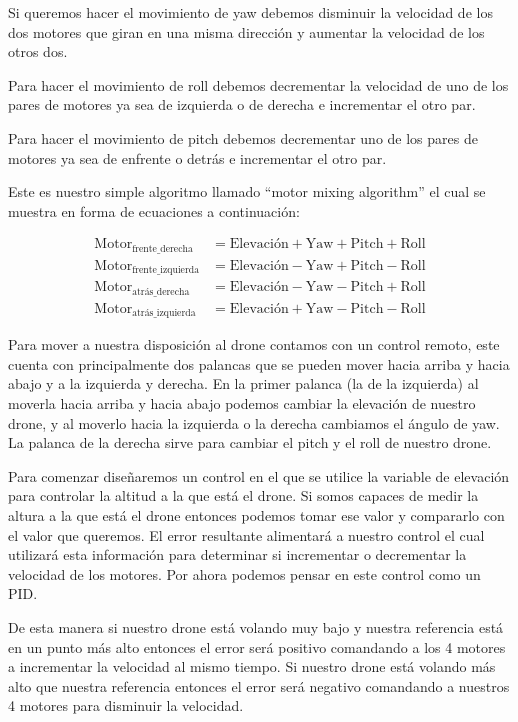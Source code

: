 \documentclass[pdflatex,sn-mathphys-num]{sn-jnl}%
\begin{document}
Si queremos hacer el movimiento de yaw debemos disminuir la velocidad de los dos motores que giran en una misma dirección y aumentar la velocidad de los otros dos.

Para hacer el movimiento de roll debemos decrementar la velocidad de uno de los pares de motores ya sea de izquierda o de derecha e incrementar el otro par.

Para hacer el movimiento de pitch debemos decrementar uno de los pares de motores ya sea de enfrente o detrás e incrementar el otro par.

Este es nuestro simple algoritmo llamado ``motor mixing algorithm'' el cual se muestra en forma de ecuaciones a continuación:

$$\begin{aligned}
\text{Motor}_{\text{frente\_derecha}} &= \text{Elevación} + \text{Yaw} + \text{Pitch} + \text{Roll} \\
\text{Motor}_{\text{frente\_izquierda}} &= \text{Elevación} - \text{Yaw} + \text{Pitch} - \text{Roll} \\
\text{Motor}_{\text{atrás\_derecha}} &= \text{Elevación} - \text{Yaw} - \text{Pitch} + \text{Roll} \\
\text{Motor}_{\text{atrás\_izquierda}} &= \text{Elevación} + \text{Yaw} - \text{Pitch} - \text{Roll}
\end{aligned}$$

Para mover a nuestra disposición al drone contamos con un control remoto, este cuenta con principalmente dos palancas que se pueden mover hacia arriba y hacia abajo y a la izquierda y derecha. En la primer palanca (la de la izquierda) al moverla hacia arriba y hacia abajo podemos cambiar la elevación de nuestro drone, y al moverlo hacia la izquierda o la derecha cambiamos el ángulo de yaw. La palanca de la derecha sirve para cambiar el pitch y el roll de nuestro drone.

Para comenzar diseñaremos un control en el que se utilice la variable de elevación para controlar la altitud a la que está el drone. Si somos capaces de medir la altura a la que está el drone entonces podemos tomar ese valor y compararlo con el valor que queremos. El error resultante alimentará a nuestro control el cual utilizará esta información para determinar si incrementar o decrementar la velocidad de los motores. Por ahora podemos pensar en este control como un PID.

De esta manera si nuestro drone está volando muy bajo y nuestra referencia está en un punto más alto entonces el error será positivo comandando a los 4 motores a incrementar la velocidad al mismo tiempo. Si nuestro drone está volando más alto que nuestra referencia entonces el error será negativo comandando a nuestros 4 motores para disminuir la velocidad.
\end{document}
